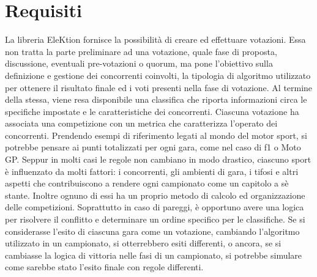 \documentclass[12pt,a4paper,openright,twoside]{book}
\begin{document}
\section{Requisiti}
La libreria EleKtion fornisce la possibilità di creare ed effettuare votazioni.
Essa non tratta la parte preliminare ad una votazione, quale fase di proposta, discussione,
eventuali pre-votazioni o quorum, ma pone l'obiettivo sulla definizione e gestione dei concorrenti coinvolti,
la tipologia di algoritmo utilizzato per ottenere il risultato finale ed i voti presenti nella fase di votazione.
Al termine della stessa, viene resa disponibile una classifica che riporta informazioni 
circa le specifiche impostate e le caratteristiche dei concorrenti.
Ciascuna votazione ha associata una competizione con un metrica che caratterizza l'operato dei concorrenti.
Prendendo esempi di riferimento legati al mondo del motor sport,
si potrebbe pensare ai punti totalizzati per ogni gara, come nel caso di \ac{f1} o Moto GP.
Seppur in molti casi le regole non cambiano in modo drastico, ciascuno sport è influenzato da molti fattori:
i concorrenti, gli ambienti di gara, i tifosi e altri aspetti che contribuiscono a rendere 
ogni campionato come un capitolo a sè stante. 
Inoltre ognuno di essi ha un proprio metodo di calcolo ed organizzazione delle competizioni. 
Soprattutto in caso di pareggi, è opportuno avere una logica per risolvere il conflitto e determinare un ordine specifico per
le classifiche. 
Se si considerasse l'esito di ciascuna gara come un votazione, cambiando
l'algoritmo utilizzato in un campionato, si otterrebbero esiti differenti, o ancora,
se si cambiasse la logica di vittoria nelle fasi di un campionato, si potrebbe simulare come
sarebbe stato l'esito finale con regole differenti.
\end{document}
